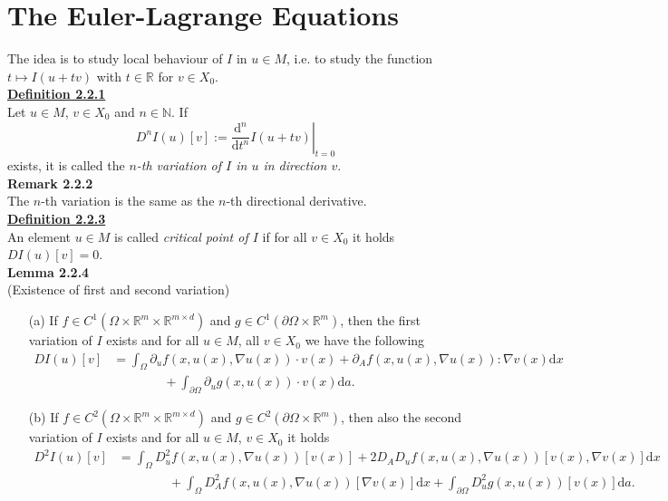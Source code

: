 \section{The Euler-Lagrange Equations}
The idea is to study local behaviour of $I$ in $u\in M$, i.e. to study the function $t\longmapsto I(u+tv)$ with $t\in\mathbb{R}$ for $v\in X_0$.\\

\textbf{\underline{Definition 2.2.1}}\\
Let $u\in M$, $v\in X_0$ and $n\in\mathbb{N}$. If
\[D^nI(u)[v]:=\left.\frac{\mathrm{d}^n}{\mathrm{d}t^n}I(u+tv)\right\vert_{t=0}\]
exists, it is called the \textit{$n$-th variation of $I$ in $u$ in direction $v$}.\\[11pt]

\textbf{Remark 2.2.2}\\
The $n$-th variation is the same as the $n$-th directional derivative.\\[11pt]

\textbf{\underline{Definition 2.2.3}}\\
An element $u\in M$ is called \textit{critical point of $I$} if for all $v\in X_0$ it holds $DI(u)[v]=0$.\\[11pt]

\hypertarget{lemma_2_2_4}{\textbf{Lemma 2.2.4}}\\
(Existence of first and second variation)
\begin{itemize}
	\item[(a)] If $f\in C^1(\Omega\times\mathbb{R}^m\times\mathbb{R}^{m\times d})$ and $g\in C^1(\partial\Omega\times\mathbb{R}^m)$, then the first variation of $I$ exists and for all $u\in M$, all $v\in X_0$ we have the following
	\begin{align*}
		DI(u)[v]&=\int_\Omega{\partial_uf(x,u(x),\nabla u(x))\cdot v(x)+\partial_Af(x,u(x),\nabla u(x)):\nabla v(x)\mathrm{d}x}\\
		&\qquad\qquad+\int_{\partial\Omega}{\partial_ug(x,u(x))\cdot v(x)\mathrm{d}a}.
	\end{align*}
	\item[(b)] If $f\in C^2(\Omega\times\mathbb{R}^m\times\mathbb{R}^{m\times d})$ and $g\in C^2(\partial\Omega\times\mathbb{R}^m)$, then also the second variation of $I$ exists and for all $u\in M$, $v\in X_0$ it holds
	\begin{align*}
		D^2I(u)[v]&=\int_\Omega{D_u^2f(x,u(x),\nabla u(x))[v(x)]+2D_AD_uf(x,u(x),\nabla u(x))[v(x),\nabla v(x)]\mathrm{d}x}\\
		&\qquad\qquad+\int_\Omega{D_A^2f(x,u(x),\nabla u(x))[\nabla v(x)]\mathrm{d}x}+\int_{\partial\Omega}{D_u^2g(x,u(x))[v(x)]\mathrm{d}a}.
	\end{align*}
\end{itemize}

